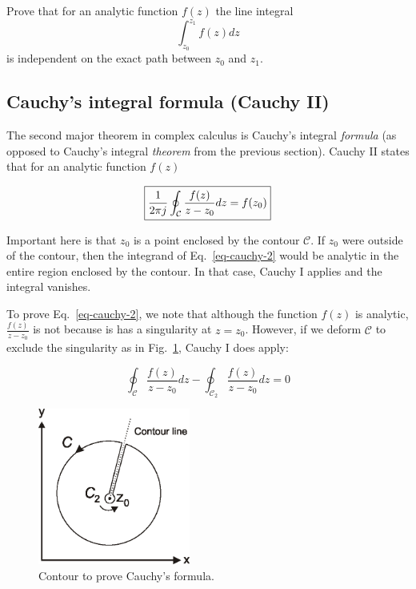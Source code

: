\begin{sidebar}
\begin{ex}
Prove that for an analytic function $f(z)$ the line integral 
$$\int_{z_0}^{z_1}f(z)dz$$
is independent on the exact path between $z_0$ and $z_1$.
\end{ex}
\end{sidebar}

\subsection {Cauchy's integral formula (Cauchy II)}

The second major theorem in complex calculus is Cauchy's integral \emph{formula}
(as opposed to Cauchy's integral \emph{theorem} from the previous section).
Cauchy II states that for an analytic function $f(z)$

\begin{equation}
\fbox{$\displaystyle
\frac{1}{2 \pi j}\oint_{\mathcal{C}} \frac{f(z)} {z-z_0} dz = f(z_0)
\label{eq-cauchy-2}
$}
\end{equation}

Important here is that $z_0$ is a point enclosed by the contour $\mathcal{C}$.
If $z_0$ were outside of the contour, then the integrand of
Eq.~\ref{eq-cauchy-2} would be analytic in the entire region enclosed by the
contour. In that case, Cauchy I applies and the integral vanishes.

To prove Eq.~\ref{eq-cauchy-2}, we note that although the function $f(z)$ is
analytic, $\frac{f(z)} {z-z_0}$ is not because is has a singularity at $z=z_0$.
However, if we deform $\mathcal{C}$ to exclude the singularity as in
Fig.~\ref{fig-cauchy-II}, Cauchy I does apply:

\begin{equation}
\oint_{\mathcal{C}} \frac{f(z)} {z-z_0} dz -\oint_{\mathcal{C}_2} \frac{f(z)}
{z-z_0} dz=0
\end{equation} 

\begin{figure}
\centering
\includegraphics[width=5cm]{complex/figures/cauchy_II}
\caption{Contour to prove Cauchy's formula.}
\label{fig-cauchy-II}
\end{figure}

